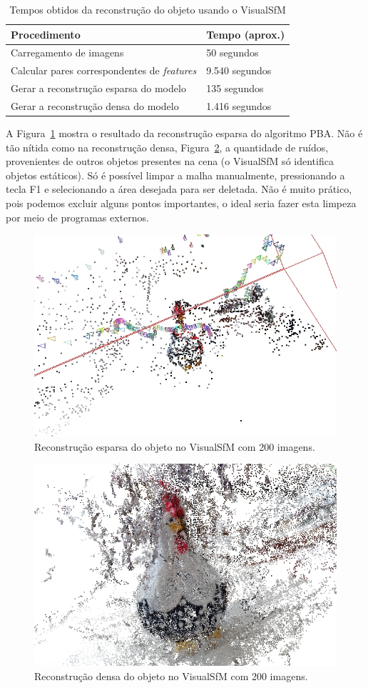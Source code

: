 \begin{table}[h!]
\caption{Tempos obtidos da reconstrução do objeto usando o VisualSfM}
\label{tab:temposSfM}
\begin{tabular}{|l|p{4.7cm}|}
\hline
Procedimento & Tempo (aprox.) \\ \hline
Carregamento de imagens & 50 segundos \\ \hline
Calcular pares correspondentes de \emph{features} & 9.540 segundos \\ \hline
Gerar a reconstrução esparsa do modelo & 135 segundos \\ \hline
Gerar a reconstrução densa do modelo & 1.416 segundos \\ \hline
\end{tabular}
\end{table}

A Figura~\ref{fig:reconstrucaoEsparsaVisualSFM} mostra o resultado da
reconstrução esparsa do algoritmo PBA. Não é tão nítida como na reconstrução
densa, Figura~\ref{fig:reconstrucaoDensaVisualSFM}, a quantidade de ruídos,
provenientes de outros objetos presentes na cena (o VisualSfM só identifica
objetos estáticos). Só é possível limpar a malha manualmente, pressionando a
tecla F1 e selecionando a área desejada para ser deletada. Não é muito prático,
pois podemos excluir alguns pontos importantes, o ideal seria fazer esta limpeza
por meio de programas externos.

\begin{figure}[!h]
	\centering
	\includegraphics[width=0.3\linewidth]{figs/galinhasparsa.jpg}
	\caption{%
	Reconstrução esparsa do objeto no VisualSfM com 200 imagens.
	}\label{fig:reconstrucaoEsparsaVisualSFM}
\end{figure}

\begin{figure}[!h]
	\centering
	\includegraphics[width=0.3\linewidth]{figs/galinhadense.jpg}
	\caption{%
	Reconstrução densa do objeto no VisualSfM com 200 imagens.
	}\label{fig:reconstrucaoDensaVisualSFM}
\end{figure}

